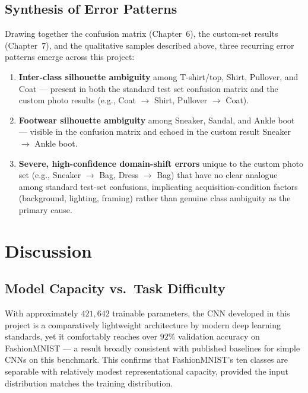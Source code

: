 \documentclass[12pt,a4paper]{report}
\begin{document}
\section{Synthesis of Error Patterns}
Drawing together the confusion matrix (Chapter~6), the custom-set results (Chapter~7), and the qualitative samples described above, three recurring error patterns emerge across this project:

\begin{enumerate}
    \item \textbf{Inter-class silhouette ambiguity} among T-shirt/top, Shirt, Pullover, and Coat — present in both the standard test set confusion matrix and the custom photo results (e.g., Coat $\to$ Shirt, Pullover $\to$ Coat).
    \item \textbf{Footwear silhouette ambiguity} among Sneaker, Sandal, and Ankle boot — visible in the confusion matrix and echoed in the custom result Sneaker $\to$ Ankle boot.
    \item \textbf{Severe, high-confidence domain-shift errors} unique to the custom photo set (e.g., Sneaker $\to$ Bag, Dress $\to$ Bag) that have no clear analogue among standard test-set confusions, implicating acquisition-condition factors (background, lighting, framing) rather than genuine class ambiguity as the primary cause.
\end{enumerate}

\chapter{Discussion}

\section{Model Capacity vs.\ Task Difficulty}
With approximately $421{,}642$ trainable parameters, the CNN developed in this project is a comparatively lightweight architecture by modern deep learning standards, yet it comfortably reaches over $92\%$ validation accuracy on FashionMNIST — a result broadly consistent with published baselines for simple CNNs on this benchmark. This confirms that FashionMNIST's ten classes are separable with relatively modest representational capacity, provided the input distribution matches the training distribution.
\end{document}
